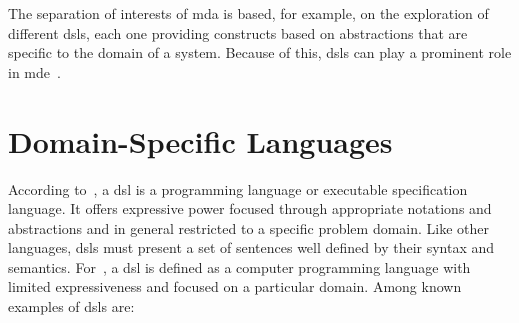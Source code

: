 The separation of interests of \ac{mda} is based, for example, on the exploration of different \acp{dsl}, each one providing constructs based on abstractions that are specific to the domain of a system.
Because of this, \acp{dsl} can play a prominent role in \ac{mde}~\cite{Schmidt:2006, Fowler:2010}.



\section{Domain-Specific Languages}
\label{sec_back:dsl}

According to~\cite{vanDeursen:2000}, a \ac{dsl} is a programming language or executable specification language. It offers expressive power focused through appropriate notations and abstractions and in general restricted to a specific problem domain.
Like other languages, \acp{dsl} must present a set of sentences well defined by their syntax and semantics.
For~\cite{Fowler:2010}, a \ac{dsl} is defined as a computer programming language with limited expressiveness and focused on a particular domain.
Among known examples of \acp{dsl} are:

